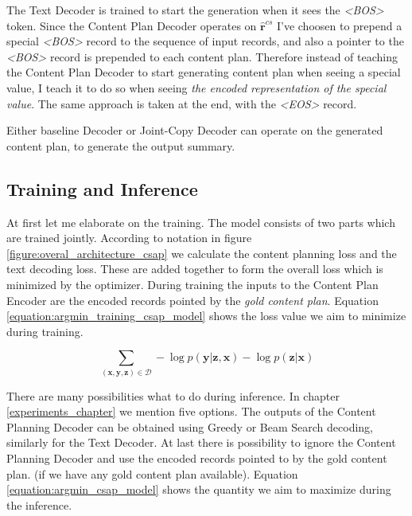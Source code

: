 The Text Decoder is trained to start the generation when it sees the \emph{\textless BOS\textgreater} token. Since the Content Plan Decoder operates on $\hat{\boldsymbol{r}}^{cs}$ I've choosen to prepend a special \emph{\textless BOS\textgreater} record to the sequence of input records, and also a pointer to the \emph{\textless BOS\textgreater} record is prepended to each content plan. Therefore instead of teaching the Content Plan Decoder to start generating content plan when seeing a special value, I teach it to do so when seeing \emph{the encoded representation of the special value}. The same approach is taken at the end, with the \emph{\textless EOS\textgreater} record.

Either baseline Decoder or Joint-Copy Decoder can operate on the generated content plan, to generate the output summary.

\subsection{Training and Inference}

At first let me elaborate on the training. The model consists of two parts which are trained jointly. According to notation in figure \ref{figure:overal_architecture_csap} we calculate the content planning loss and the text decoding loss. These are added together to form the overall loss which is minimized by the optimizer. During training the inputs to the Content Plan Encoder are the encoded records pointed by the \emph{gold content plan}. Equation \ref{equation:argmin_training_csap_model} shows the loss value we aim to minimize during training.

\begin{equation} \label{equation:argmin_training_csap_model}
    \sum_{(\boldsymbol{x}, \boldsymbol{y}, \boldsymbol{z}) \in \mathcal{D}} - \log{p(\boldsymbol{y}|\boldsymbol{z}, \boldsymbol{x})} - \log{p(\boldsymbol{z} | \boldsymbol{x})}
\end{equation}

There are many possibilities what to do during inference. In chapter \ref{experiments_chapter} we mention five options. The outputs of the Content Planning Decoder can be obtained using Greedy or Beam Search decoding, similarly for the Text Decoder. At last there is possibility to ignore the Content Planning Decoder and use the encoded records pointed to by the gold content plan. (if we have any gold content plan available). Equation \ref{equation:argmin_csap_model} shows the quantity we aim to maximize during the inference.

